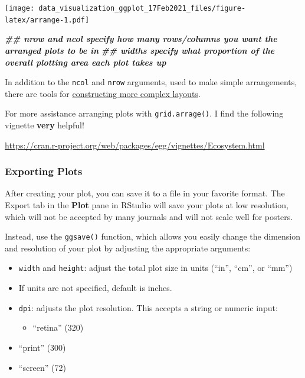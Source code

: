 \documentclass[
]{article}
\newenvironment{Shaded}{\begin{snugshade}}{\end{snugshade}}
\newcommand{\DocumentationTok}[1]{\textcolor[rgb]{0.56,0.35,0.01}{\textbf{\textit{#1}}}}
\providecommand{\tightlist}{%
  \setlength{\itemsep}{0pt}\setlength{\parskip}{0pt}}
\begin{document}
\texttt{[image: data\_visualization\_ggplot\_17Feb2021\_files/figure-latex/arrange-1.pdf]}

\begin{Shaded}
\begin{Highlighting}[]
\DocumentationTok{\#\# nrow and ncol specify how many rows/columns you want the arranged plots to be in}
\DocumentationTok{\#\# widths specify what proportion of the overall plotting area each plot takes up}
\end{Highlighting}
\end{Shaded}

In addition to the \texttt{ncol} and \texttt{nrow} arguments, used to
make simple arrangements, there are tools for
\href{https://cran.r-project.org/web/packages/gridExtra/vignettes/arrangeGrob.html}{constructing
more complex layouts}.

For more assistance arranging plots with \texttt{grid.arrage()}. I find
the following vignette \textbf{very} helpful!

\url{https://cran.r-project.org/web/packages/egg/vignettes/Ecosystem.html}

\hypertarget{exporting-plots}{%
\subsubsection{Exporting Plots}\label{exporting-plots}}

After creating your plot, you can save it to a file in your favorite
format. The Export tab in the \textbf{Plot} pane in RStudio will save
your plots at low resolution, which will not be accepted by many
journals and will not scale well for posters.

Instead, use the \texttt{ggsave()} function, which allows you easily
change the dimension and resolution of your plot by adjusting the
appropriate arguments:

\begin{itemize}
\tightlist
\item
  \texttt{width} and \texttt{height}: adjust the total plot size in
  units (``in'', ``cm'', or ``mm'')
\item
  If units are not specified, default is inches.
\item
  \texttt{dpi}: adjusts the plot resolution. This accepts a string or
  numeric input:

  \begin{itemize}
  \tightlist
  \item
    ``retina'' (320)
  \end{itemize}
\item
  ``print'' (300)
\item
  ``screen'' (72)
\end{itemize}
\end{document}
